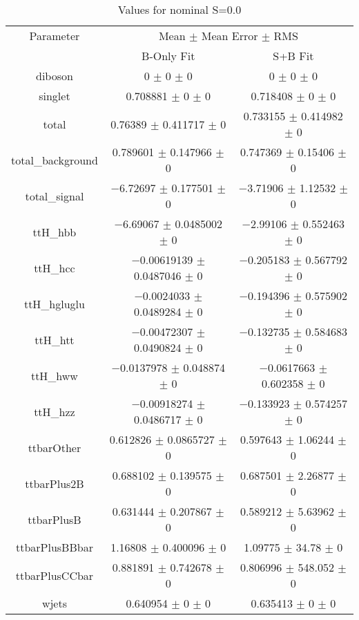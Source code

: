 \begin{table}
\centering
\caption{Values for nominal S=0.0}
\begin{tabular}{ccc}
\toprule
Parameter & \multicolumn{2}{c}{Mean $\pm$ Mean Error $\pm$ RMS}\\
 & B-Only Fit & S+B Fit\\
\midrule
diboson & \num{0} $\pm$ \num{0} $\pm$ \num{0} & \num{0} $\pm$ \num{0} $\pm$ \num{0}\\
singlet & \num{0.708881} $\pm$ \num{0} $\pm$ \num{0} & \num{0.718408} $\pm$ \num{0} $\pm$ \num{0}\\
total & \num{0.76389} $\pm$ \num{0.411717} $\pm$ \num{0} & \num{0.733155} $\pm$ \num{0.414982} $\pm$ \num{0}\\
total\_background & \num{0.789601} $\pm$ \num{0.147966} $\pm$ \num{0} & \num{0.747369} $\pm$ \num{0.15406} $\pm$ \num{0}\\
total\_signal & \num{-6.72697} $\pm$ \num{0.177501} $\pm$ \num{0} & \num{-3.71906} $\pm$ \num{1.12532} $\pm$ \num{0}\\
ttH\_hbb & \num{-6.69067} $\pm$ \num{0.0485002} $\pm$ \num{0} & \num{-2.99106} $\pm$ \num{0.552463} $\pm$ \num{0}\\
ttH\_hcc & \num{-0.00619139} $\pm$ \num{0.0487046} $\pm$ \num{0} & \num{-0.205183} $\pm$ \num{0.567792} $\pm$ \num{0}\\
ttH\_hgluglu & \num{-0.0024033} $\pm$ \num{0.0489284} $\pm$ \num{0} & \num{-0.194396} $\pm$ \num{0.575902} $\pm$ \num{0}\\
ttH\_htt & \num{-0.00472307} $\pm$ \num{0.0490824} $\pm$ \num{0} & \num{-0.132735} $\pm$ \num{0.584683} $\pm$ \num{0}\\
ttH\_hww & \num{-0.0137978} $\pm$ \num{0.048874} $\pm$ \num{0} & \num{-0.0617663} $\pm$ \num{0.602358} $\pm$ \num{0}\\
ttH\_hzz & \num{-0.00918274} $\pm$ \num{0.0486717} $\pm$ \num{0} & \num{-0.133923} $\pm$ \num{0.574257} $\pm$ \num{0}\\
ttbarOther & \num{0.612826} $\pm$ \num{0.0865727} $\pm$ \num{0} & \num{0.597643} $\pm$ \num{1.06244} $\pm$ \num{0}\\
ttbarPlus2B & \num{0.688102} $\pm$ \num{0.139575} $\pm$ \num{0} & \num{0.687501} $\pm$ \num{2.26877} $\pm$ \num{0}\\
ttbarPlusB & \num{0.631444} $\pm$ \num{0.207867} $\pm$ \num{0} & \num{0.589212} $\pm$ \num{5.63962} $\pm$ \num{0}\\
ttbarPlusBBbar & \num{1.16808} $\pm$ \num{0.400096} $\pm$ \num{0} & \num{1.09775} $\pm$ \num{34.78} $\pm$ \num{0}\\
ttbarPlusCCbar & \num{0.881891} $\pm$ \num{0.742678} $\pm$ \num{0} & \num{0.806996} $\pm$ \num{548.052} $\pm$ \num{0}\\
wjets & \num{0.640954} $\pm$ \num{0} $\pm$ \num{0} & \num{0.635413} $\pm$ \num{0} $\pm$ \num{0}\\
\bottomrule
\end{tabular}
\end{table}